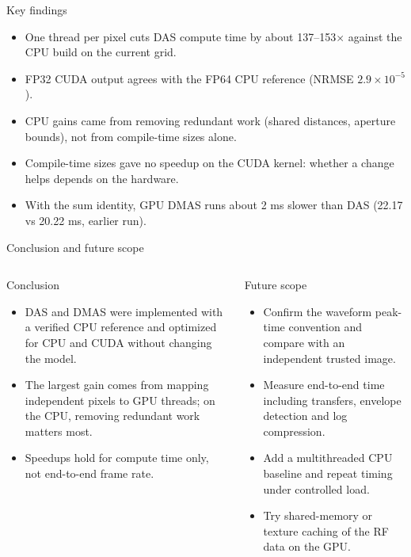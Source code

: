 \documentclass[aspectratio=169,10pt]{beamer}
\begin{document}
\begin{frame}{Key findings}
  \begin{itemize}\setlength\itemsep{.7em}
    \item One thread per pixel cuts DAS compute time by about 137--153$\times$ against the CPU build on the current grid.
    \item FP32 CUDA output agrees with the FP64 CPU reference (NRMSE $2.9\times10^{-5}$).
    \item CPU gains came from removing redundant work (shared distances, aperture bounds), not from compile-time sizes alone.
    \item Compile-time sizes gave no speedup on the CUDA kernel: whether a change helps depends on the hardware.
    \item With the sum identity, GPU DMAS runs about 2 ms slower than DAS (22.17 vs 20.22 ms, earlier run).
  \end{itemize}
\end{frame}

\begin{frame}{Conclusion and future scope}
  \begin{columns}[T,onlytextwidth]
    \begin{block}{Conclusion}
      \small
      \begin{itemize}\setlength\itemsep{.4em}
        \item DAS and DMAS were implemented with a verified CPU reference and optimized for CPU and CUDA without changing the model.
        \item The largest gain comes from mapping independent pixels to GPU threads; on the CPU, removing redundant work matters most.
        \item Speedups hold for compute time only, not end-to-end frame rate.
      \end{itemize}
    \end{block}
    \begin{block}{Future scope}
      \small
      \begin{itemize}\setlength\itemsep{.4em}
        \item Confirm the waveform peak-time convention and compare with an independent trusted image.
        \item Measure end-to-end time including transfers, envelope detection and log compression.
        \item Add a multithreaded CPU baseline and repeat timing under controlled load.
        \item Try shared-memory or texture caching of the RF data on the GPU.
      \end{itemize}
    \end{block}
  \end{columns}
\end{frame}
\end{document}

